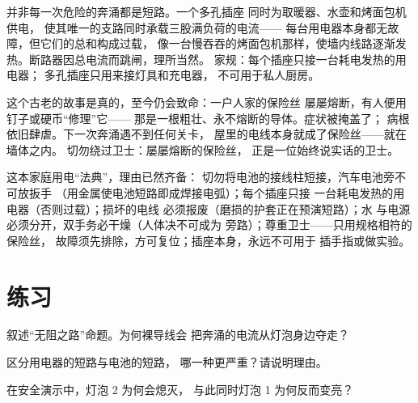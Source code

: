 \begin{example}[过载：礼貌的奔涌]\label{ex:g7:short-circuits-safety:overload}
并非每一次危险的奔涌都是短路。一个多孔插座
同时为取暖器、水壶和烤面包机供电，
使其唯一的支路同时承载三股满负荷的电流——
每台用电器本身都无故障，但它们的总和构成过载，
像一台慢吞吞的烤面包机那样，使墙内线路逐渐发热。断路器因总电流而跳闸，理所当然。
家规：每个插座只接一台耗电发热的用电器；
多孔插座只用来接灯具和充电器，
不可用于私人厨房。
\end{example}

\begin{remark}[禁止的修理]\label{rem:g7:short-circuits-safety:nail}
这个古老的故事是真的，至今仍会致命：一户人家的保险丝
屡屡熔断，有人便用钉子或硬币“修理”它——
那是一根粗壮、永不熔断的导体。症状被掩盖了；
病根依旧肆虐。下一次奔涌遇不到任何关卡，
屋里的电线本身就成了保险丝——就在墙体之内。
切勿绕过卫士：屡屡熔断的保险丝，
正是一位始终说实话的卫士。
\end{remark}

\begin{remark}[规则的最终形式]\label{rem:g7:short-circuits-safety:rules}
这本家庭用电“法典”，理由已然齐备：
切勿将电池的接线柱短接，汽车电池旁不可放扳手
（用金属使电池短路即成焊接电弧）；每个插座只接
一台耗电发热的用电器（否则过载）；损坏的电线
必须报废（磨损的护套正在预演短路）；水
与电源必须分开，双手务必干燥（人体决不可成为
旁路）；尊重卫士——只用规格相符的保险丝，
故障须先排除，方可复位；插座本身，永远不可用于
插手指或做实验。
\end{remark}

\section{练习}

\begin{exercise}[$\star$]\label{exo:g7:short-circuits-safety:1}
叙述“无阻之路”命题。为何裸导线会
把奔涌的电流从灯泡身边夺走？
\end{exercise}

\begin{exercise}[$\star$]\label{exo:g7:short-circuits-safety:2}
区分用电器的短路与电池的短路，
哪一种更严重？请说明理由。
\end{exercise}

\begin{exercise}[$\star$]\label{exo:g7:short-circuits-safety:3}
在安全演示中，灯泡 2 为何会熄灭，
与此同时灯泡 1 为何反而变亮？
\end{exercise}

